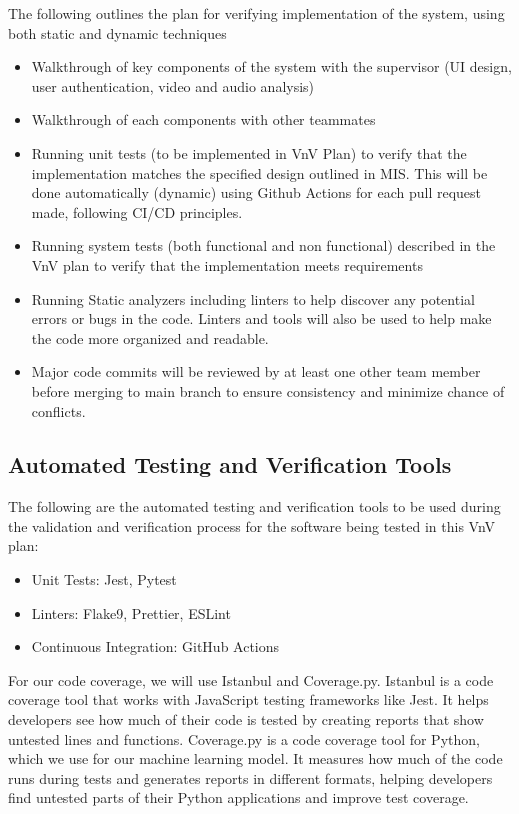 \documentclass[12pt, titlepage]{article}
\begin{document}
The following outlines the plan for verifying implementation of the system, using both static and dynamic techniques 

\begin{itemize}
  \item Walkthrough of key components of the system with the supervisor (UI design, user authentication, video and audio analysis)
  \item Walkthrough of each components with other teammates 
  \item Running unit tests (to be implemented in VnV Plan) to verify that the implementation matches the specified design 
  outlined in MIS. This will be done automatically (dynamic) using Github Actions for each pull request made, following
  CI/CD principles. 
  \item Running system tests (both functional and non functional) described in the VnV plan to verify that the implementation 
  meets requirements
  \item Running Static analyzers including linters to help discover any potential errors or bugs in the code. Linters 
  and tools will also be used to help make the code more organized and readable. 
  \item Major code commits will be reviewed by at least one other team member before merging to main branch to ensure
   consistency and minimize chance of conflicts. 
\end{itemize}


\subsection{Automated Testing and Verification Tools}

The following are the automated testing and verification tools to be used during the validation and 
verification process for the software being tested in this VnV plan:
\begin{itemize}
  \item Unit Tests: Jest, Pytest
  \item Linters: Flake9, Prettier, ESLint
  \item Continuous Integration: GitHub Actions
\end{itemize}
\hspace{2em} For our code coverage, we will use Istanbul and Coverage.py. Istanbul is a code coverage 
tool that works with JavaScript testing frameworks like Jest. It helps developers see how much of their 
code is tested by creating reports that show untested lines and functions. Coverage.py is a code coverage 
tool for Python, which we use for our machine learning model. It measures how much of the code runs during 
tests and generates reports in different formats, helping developers find untested parts of their Python 
applications and improve test coverage.
\end{document}

